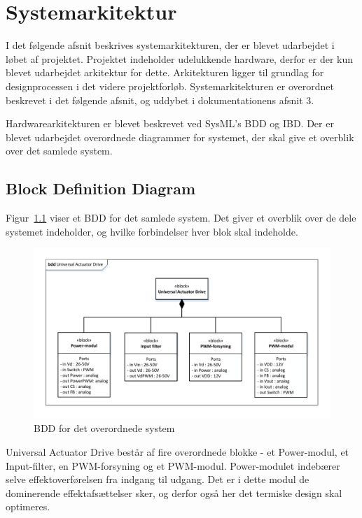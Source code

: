 
\chapter{Systemarkitektur}
I det følgende afsnit beskrives systemarkitekturen, der er blevet udarbejdet i løbet af projektet. Projektet indeholder udelukkende hardware, derfor er der kun blevet udarbejdet arkitektur for dette. Arkitekturen ligger til grundlag for designprocessen i det videre projektforløb. Systemarkitekturen er overordnet beskrevet i det følgende afsnit, og uddybet i dokumentationens afsnit 3.

Hardwarearkitekturen er blevet beskrevet ved SysML's BDD og IBD. Der er blevet udarbejdet overordnede diagrammer for systemet, der skal give et overblik over det samlede system.

\section{Block Definition Diagram}
Figur~\ref{fig:BDD} viser et BDD for det samlede system. Det giver et overblik over de dele systemet indeholder, og hvilke forbindelser hver blok skal indeholde. 

\begin{figure}[H]
	\centering
	\includegraphics[width=1\linewidth]{../Dokumentation/tex/systemarkitektur/billeder/BDD.pdf}
	\caption{BDD for det overordnede system}
	\label{fig:BDD}
\end{figure}

\noindent Universal Actuator Drive består af fire overordnede blokke - et Power-modul, et Input-filter, en PWM-forsyning og et PWM-modul. Power-modulet indebærer selve effektoverførelsen fra indgang til udgang. Det er i dette modul de dominerende effektafsættelser sker, og derfor også her det termiske design skal optimeres. 

